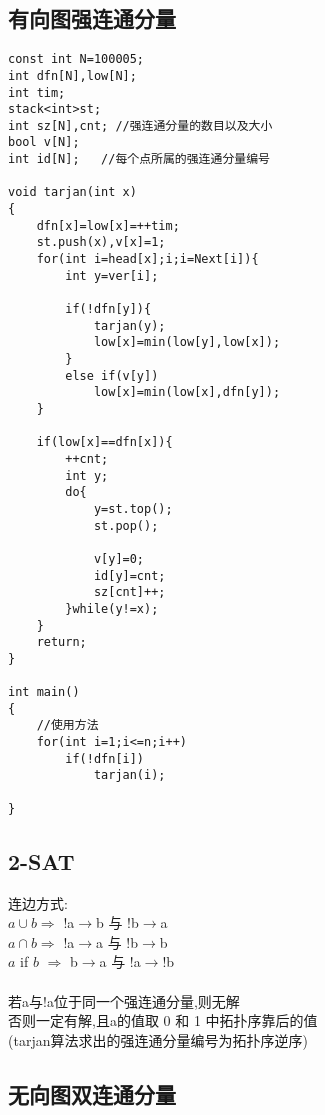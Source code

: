 \documentclass[twocolumn,a4]{article}
\begin{document}
\subsection{有向图强连通分量}
\begin{lstlisting}
const int N=100005;
int dfn[N],low[N];
int tim;
stack<int>st;
int sz[N],cnt; //强连通分量的数目以及大小
bool v[N];
int id[N];   //每个点所属的强连通分量编号

void tarjan(int x)
{
    dfn[x]=low[x]=++tim;
    st.push(x),v[x]=1;
    for(int i=head[x];i;i=Next[i]){
        int y=ver[i];
        
        if(!dfn[y]){
            tarjan(y);
            low[x]=min(low[y],low[x]);
        }
        else if(v[y])
            low[x]=min(low[x],dfn[y]);
    }
    
    if(low[x]==dfn[x]){
        ++cnt;
        int y;
        do{
            y=st.top();
            st.pop();
            
            v[y]=0;
            id[y]=cnt;
            sz[cnt]++;
        }while(y!=x);
    }
    return;
}

int main()
{
    //使用方法
    for(int i=1;i<=n;i++)
        if(!dfn[i])
            tarjan(i);

}
\end{lstlisting}

\subsection{2-SAT}

连边方式:\\
$a\cup b \Rightarrow $ !a$\rightarrow$b 与 !b$\rightarrow$a\\
$a\cap b \Rightarrow $ !a$\rightarrow$a 与 !b$\rightarrow$b\\
$a$ if $b$ $\Rightarrow $ b$\rightarrow$a 与 !a$\rightarrow$!b\\
\\
若a与!a位于同一个强连通分量,则无解\\
否则一定有解,且a的值取 0 和 1 中拓扑序靠后的值\\
(tarjan算法求出的强连通分量编号为拓扑序逆序)

\subsection{无向图双连通分量}
\begin{lstlisting}

\end{lstlisting}
\end{document}
